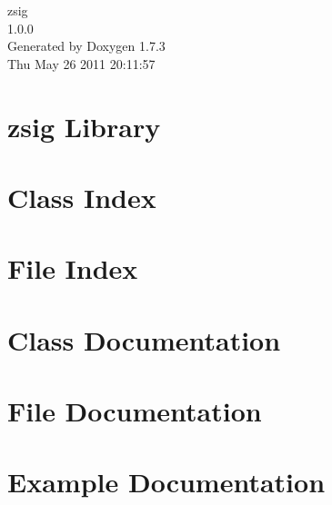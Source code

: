 \documentclass[a4paper]{book}
\begin{document}
\hypersetup{pageanchor=false}
\begin{titlepage}
\vspace*{7cm}
\begin{center}
{\Large zsig \\[1ex]\large 1.0.0 }\\
\vspace*{1cm}
{\large Generated by Doxygen 1.7.3}\\
\vspace*{0.5cm}
{\small Thu May 26 2011 20:11:57}\\
\end{center}
\end{titlepage}
\clearemptydoublepage
{}
\tableofcontents
\clearemptydoublepage
{}
\hypersetup{pageanchor=true}
\chapter{zsig Library}
\label{index}\hypertarget{index}{}
\chapter{Class Index}

\chapter{File Index}

\chapter{Class Documentation}

\chapter{File Documentation}


\chapter{Example Documentation}


\printindex
\end{document}
